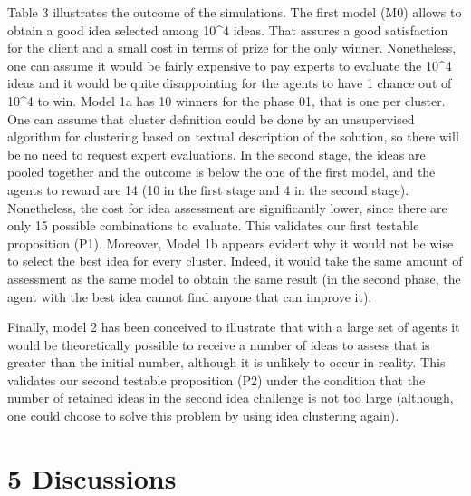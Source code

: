 \documentclass[]{elsarticle} %
\begin{document}
Table 3 illustrates the outcome of the simulations. The first model (M0)
allows to obtain a good idea selected among 10\^{}4 ideas. That assures
a good satisfaction for the client and a small cost in terms of prize
for the only winner. Nonetheless, one can assume it would be fairly
expensive to pay experts to evaluate the 10\^{}4 ideas and it would be
quite disappointing for the agents to have 1 chance out of 10\^{}4 to
win. Model 1a has 10 winners for the phase 01, that is one per cluster.
One can assume that cluster definition could be done by an unsupervised
algorithm for clustering based on textual description of the solution,
so there will be no need to request expert evaluations. In the second
stage, the ideas are pooled together and the outcome is below the one of
the first model, and the agents to reward are 14 (10 in the first stage
and 4 in the second stage). Nonetheless, the cost for idea assessment
are significantly lower, since there are only 15 possible combinations
to evaluate. This validates our first testable proposition (P1).
Moreover, Model 1b appears evident why it would not be wise to select
the best idea for every cluster. Indeed, it would take the same amount
of assessment as the same model to obtain the same result (in the second
phase, the agent with the best idea cannot find anyone that can improve
it).

Finally, model 2 has been conceived to illustrate that with a large set
of agents it would be theoretically possible to receive a number of
ideas to assess that is greater than the initial number, although it is
unlikely to occur in reality. This validates our second testable
proposition (P2) under the condition that the number of retained ideas
in the second idea challenge is not too large (although, one could
choose to solve this problem by using idea clustering again).

\section{5 Discussions}\label{discussions}
\end{document}
